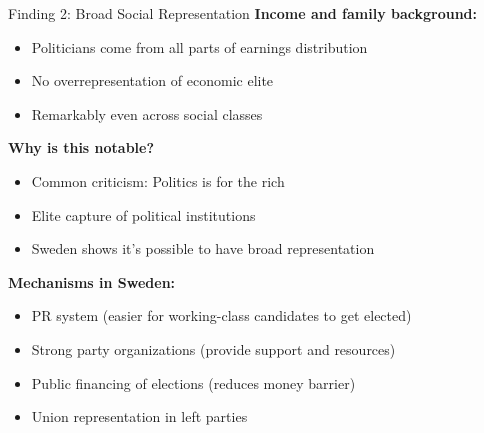 \documentclass[10pt]{beamer}
\begin{document}
\begin{frame}{Finding 2: Broad Social Representation}
\textbf{Income and family background:}


\begin{itemize}
\item Politicians come from all parts of earnings distribution
\item No overrepresentation of economic elite
\item Remarkably even across social classes
\end{itemize}



\textbf{Why is this notable?}
\begin{itemize}
\item Common criticism: Politics is for the rich
\item Elite capture of political institutions
\item \alert{Sweden shows it's possible to have broad representation}
\end{itemize}



\textbf{Mechanisms in Sweden:}
\begin{itemize}
\item PR system (easier for working-class candidates to get elected)
\item Strong party organizations (provide support and resources)
\item Public financing of elections (reduces money barrier)
\item Union representation in left parties
\end{itemize}
\end{frame}
\end{document}
